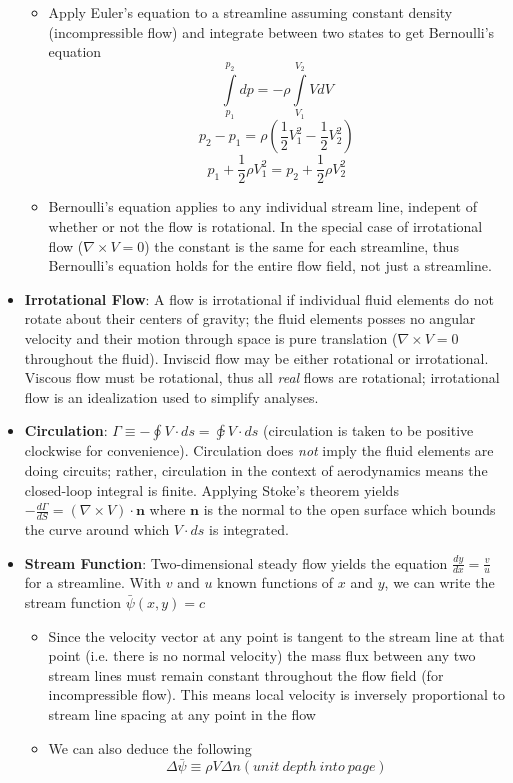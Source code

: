 \documentclass[11pt]{article}
\newcommand{\Item}[1]{\item \textbf{#1}:}
\newcommand{\CenteredBoxed}[1]{\begin{center}\boxed{#1}\end{center}}
\newcommand{\intlim}[2]{\int\limits_{#1}^{#2}}
\begin{document}
\begin{itemize}
\begin{itemize}
	\item Apply Euler's equation to a streamline assuming constant density (incompressible flow) and integrate between two states to get Bernoulli's equation 
	$$\intlim{p_1}{p_2}dp = -\rho\intlim{V_1}{V_2}VdV$$
	$$p_2-p_1 = \rho\left(\frac{1}{2}V_1^2 - \frac{1}{2}V_2^2\right)$$
	$$p_1 + \frac{1}{2}\rho V_1^2 = p_2 + \frac{1}{2}\rho V_2^2$$
	\CenteredBoxed{p+\frac{1}{2}\rho V^2 = const.}
	\item Bernoulli's equation applies to any individual stream line, indepent of whether or not the flow is rotational. In the special case of irrotational flow ($\nabla\times V = 0$) the constant is the same for each streamline, thus Bernoulli's equation holds for the entire flow field, not just a streamline.
	\end{itemize}
\Item{Irrotational Flow} A flow is irrotational if individual fluid elements do not rotate about their centers of gravity; the fluid elements posses no angular velocity and their motion through space is pure translation ($\nabla\times V = 0$ throughout the fluid). Inviscid flow may be either rotational or irrotational. Viscous flow must be rotational, thus all \emph{real} flows are rotational; irrotational flow is an idealization used to simplify analyses.
\Item{Circulation} $\Gamma\equiv-\oint V\cdot ds=\varointclockwise V\cdot ds$ (circulation is taken to be positive clockwise for convenience). Circulation does \emph{not} imply the fluid elements are doing circuits; rather, circulation in the context of aerodynamics means the closed-loop integral is finite. Applying Stoke's theorem yields $-\frac{d\Gamma}{dS} = (\nabla\times V)\cdot\mathbf{n}$ where $\mathbf{n}$ is the normal to the open surface which bounds the curve around which $V\cdot ds$ is integrated.
\Item{Stream Function} Two-dimensional steady flow yields the equation $\frac{dy}{dx} = \frac{v}{u}$ for a streamline. With $v$ and $u$ known functions of $x$ and $y$, we can write the stream function $\bar{\psi}(x,y) = c$
	\begin{itemize}
	\item Since the velocity vector at any point is tangent to the stream line at that point (i.e. there is no normal velocity) the mass flux between any two stream lines must remain constant throughout the flow field (for incompressible flow). This means local velocity is inversely proportional to stream line spacing at any point in the flow
	\item We can also deduce the following
	$$ \Delta\bar{\psi}\equiv\rho V\Delta n(unit\ depth\ into\ page)$$

\end{itemize}
\end{itemize}
\end{document}
